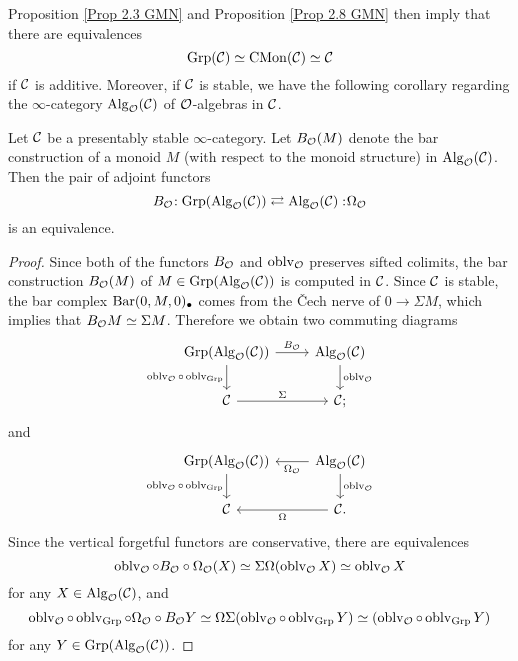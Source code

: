 Proposition \ref{Prop 2.3 GMN} and Proposition \ref{Prop 2.8 GMN} then imply that 
there are equivalences
$$
\operatorname{Grp}({\mathcal{C}})\simeq\operatorname{CMon}({\mathcal{C}}) \simeq {\mathcal{C}}
$$
if ${\mathcal{C}}$ is additive. Moreover, if ${\mathcal{C}}$ is stable, we have the following corollary regarding the $\infty$-category $\operatorname{Alg}_{{\mathcal{O}}}({\mathcal{C}})$ of ${\mathcal{O}}$-algebras in ${\mathcal{C}}$.
\begin{corollary}
    Let ${\mathcal{C}}$ be a presentably stable $\infty$-category.
    Let $B_{{\mathcal{O}}}(M)$ denote the bar construction of a monoid $M$ (with respect to the monoid structure) in $\operatorname{Alg}_{{\mathcal{O}}}({\mathcal{C}})$.
    Then the pair of adjoint functors
$$
B_{{\mathcal{O}}}\negmedspace: \operatorname{Grp}(\operatorname{Alg}_{{\mathcal{O}}}({\mathcal{C}}))\rightleftarrows \operatorname{Alg}_{{\mathcal{O}}}({\mathcal{C}}):\negmedspace \Omega_{{\mathcal{O}}}
$$
is an equivalence.
\end{corollary}
\label{Alg(C) equivalent to groups in Alg(C)}
\begin{proof}
    Since both of the functors $B_{{\mathcal{O}}}$ and $\operatorname{oblv}_{{\mathcal{O}}}$ preserves sifted colimits, the bar construction $B_{{\mathcal{O}}}(M)$ of $M\in \operatorname{Grp}(\operatorname{Alg}_{{\mathcal{O}}}({\mathcal{C}}))$ is computed in ${\mathcal{C}}$.
    Since ${\mathcal{C}}$ is stable, the bar complex $\operatorname{Bar}(0, M, 0)_{\bullet}$ comes from the \v{C}ech nerve of $0 \to \Sigma M$, which implies that
    $B_{{\mathcal{O}}}M \simeq \Sigma M$.
    Therefore we obtain two commuting diagrams
	\[
	\begin{tikzcd}
		\Grp(\Alg_{\CO}(\CC)) & \Alg_{\CO}(\CC) \\
		\CC &
		\CC ;
		\arrow[from=1-1, to=1-2, "B_{\CO}"]
		\arrow[from=1-1, to=2-1, "\oblv_{\CO}\circ \oblv_{\Grp}" left]
		\arrow[from=1-2, to=2-2, "\oblv_{\CO}"]
		\arrow[from=2-1, to=2-2, "\Sigma"]
	\end{tikzcd}
	\]
	and 
	\[
	\begin{tikzcd}
		\Grp(\Alg_{\CO}(\CC)) & \Alg_{\CO}(\CC) \\
		\CC &
		\CC.
		\arrow[from=1-2, to=1-1, "\Omega_{\CO}"]
		\arrow[from=1-1, to=2-1, "\oblv_{\CO}\circ \oblv_{\Grp}" left]
		\arrow[from=1-2, to=2-2, "\oblv_{\CO}"]
		\arrow[from=2-2, to=2-1, "\Omega"]
	\end{tikzcd}
	\]
	Since the vertical forgetful functors are conservative, there are equivalences
$$	    
\operatorname{oblv}_{{\mathcal{O}}}\circ B_{{\mathcal{O}}} \circ  \Omega_{{\mathcal{O}}} (X)
	    \simeq \Sigma \Omega (\operatorname{oblv}_{{\mathcal{O}}}X) \simeq \operatorname{oblv}_{{\mathcal{O}}} X
$$
for any $X\in  \operatorname{Alg}_{{\mathcal{O}}}({\mathcal{C}})$,
and 
$$
\operatorname{oblv}_{{\mathcal{O}}}\circ \operatorname{oblv}_{\operatorname{Grp}} \circ \Omega_{{\mathcal{O}}} \circ B_{{\mathcal{O}}} Y
\simeq 
\Omega \Sigma(\operatorname{oblv}_{{\mathcal{O}}}\circ \operatorname{oblv}_{\operatorname{Grp}} Y)
\simeq
(\operatorname{oblv}_{{\mathcal{O}}}\circ \operatorname{oblv}_{\operatorname{Grp}}Y)
$$
for any $Y\in\operatorname{Grp}(\operatorname{Alg}_{{\mathcal{O}}}({\mathcal{C}})) $.
\end{proof}




